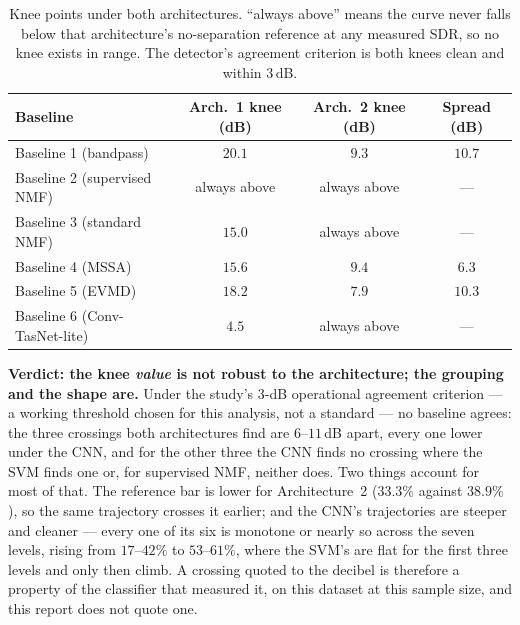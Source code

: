 \documentclass[11pt]{article}
\begin{document}
\begin{table}[H]
\centering
\caption{Knee points under both architectures. ``always above'' means the curve never falls below that architecture's no-separation reference at any measured SDR, so no knee exists in range. The detector's agreement criterion is both knees clean and within $3$\,dB.}
\label{tab:kneecompare}
\begin{tabular}{@{}lccc@{}}
\toprule
Baseline & Arch.\ 1 knee (dB) & Arch.\ 2 knee (dB) & Spread (dB) \\
\midrule
Baseline 1 (bandpass)         & $20.1$ & $9.3$ & $10.7$ \\
Baseline 2 (supervised NMF)   & always above & always above & --- \\
Baseline 3 (standard NMF)     & $15.0$ & always above & --- \\
Baseline 4 (MSSA)             & $15.6$ & $9.4$ & $6.3$ \\
Baseline 5 (EVMD)             & $18.2$ & $7.9$ & $10.3$ \\
Baseline 6 (Conv-TasNet-lite) & $4.5$  & always above & --- \\
\bottomrule
\end{tabular}
\end{table}

\textbf{Verdict: the knee \emph{value} is not robust to the architecture;
the grouping and the shape are.} Under the study's 3-dB operational
agreement criterion --- a working threshold chosen for this analysis, not
a standard --- no baseline agrees: the three crossings both architectures
find are $6$--$11$\,dB apart, every one lower under the CNN, and for the
other three the CNN finds no crossing where the SVM finds one or, for
supervised NMF, neither does. Two things account for most of that. The
reference bar is lower for Architecture~2 ($33.3\%$ against $38.9\%$),
so the same trajectory crosses it earlier; and the CNN's trajectories are
steeper and cleaner --- every one of its six is monotone or nearly so
across the seven levels, rising from $17$--$42\%$ to $53$--$61\%$, where
the SVM's are flat for the first three levels and only then climb. A
crossing quoted to the decibel is therefore a property of the classifier
that measured it, on this dataset at this sample size, and this report
does not quote one.
\end{document}

